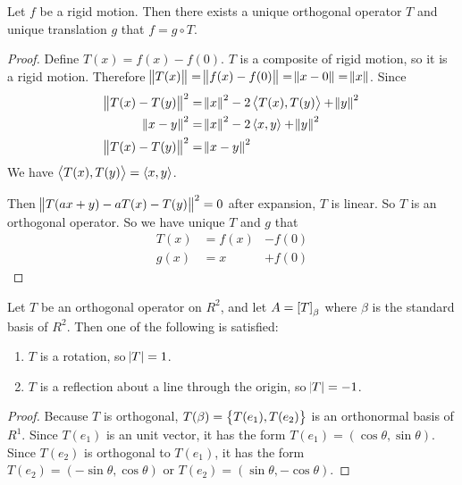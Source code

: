 \begin{theorem}
    Let $f$ be a rigid motion. Then there exists a unique orthogonal operator $T$ and unique translation $g$ that $f = g \circ T$.
\end{theorem}
\begin{proof}
    Define $T(x) = f(x) - f(0)$. $T$ is a composite of rigid motion, so it is a rigid motion. Therefore $\norm{T(x)} = \norm{f(x) - f(0)} = \norm{x - 0} = \norm{x}$. Since
    \begin{equation*}
        \begin{aligned}
            \norm{T(x) - T(y)}^2 &= \norm{x}^2 - 2 \left\langle \displaystyle T(x), T(y) \right\rangle + \norm{y}^2 \\
            \norm{x - y}^2 &= \norm{x}^2 - 2 \left\langle \displaystyle x, y \right\rangle + \norm{y}^2 \\
            \norm{T(x) - T(y)}^2 &= \norm{x - y}^2
        \end{aligned}
    \end{equation*}
    We have $\left\langle \displaystyle T(x), T(y) \right\rangle = \left\langle \displaystyle x, y \right\rangle$.
    
    Then $\norm{T(ax + y) - aT(x) - T(y)}^2 = 0$ after expansion, $T$ is linear. So $T$ is an orthogonal operator. So we have unique $T$ and $g$ that
    \begin{equation}
        \begin{aligned}
            T(x) &= f(x) &- f(0) \\
            g(x) &= x &+ f(0)
        \end{aligned}
    \end{equation}
\end{proof}

\begin{theorem}
    Let $T$ be an orthogonal operator on $R^2$, and let $A = \coordinate{T}_\beta$ where $\beta$ is the standard basis of $R^2$. Then one of the following is satisfied:
    \begin{enumerate}
        \item $T$ is a rotation, so $\abs{T} = 1$.
        \item $T$ is a reflection about a line through the origin, so $\abs{T} = -1$.
    \end{enumerate}
\end{theorem}
\begin{proof}
    Because $T$ is orthogonal, $T(\beta) = \set{T(e_1), T(e_2)}$ is an orthonormal basis of $R^1$. Since $T(e_1)$ is an unit vector, it has the form $T(e_1) = (\cos{\theta}, \sin{\theta})$. Since $T(e_2)$ is orthogonal to $T(e_1)$, it has the form $T(e_2) = (-\sin{\theta}, \cos{\theta})$ or $T(e_2) = (\sin{\theta}, -\cos{\theta})$.
\end{proof}

